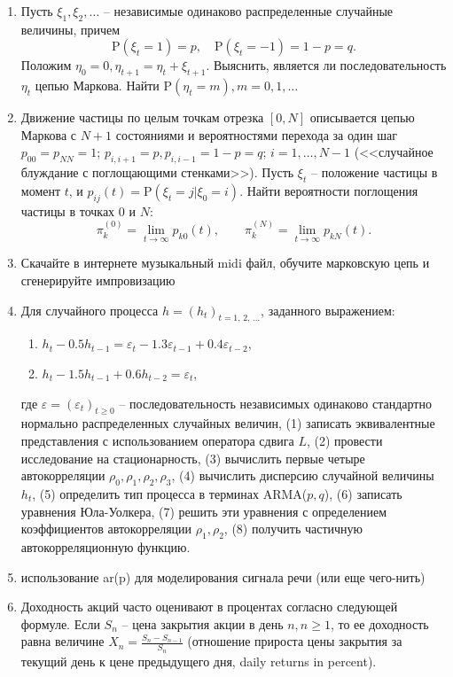 \documentclass[a4paper,14pt]{extreport}
\renewcommand{\=}[1]{\stackrel{#1}{=}} %
\newcommand{\Proba}{\mathrm{P}}
\newcommand{\generaltime}{t \geqslant 0}
\newcommand{\discretetime}{t = 1,\,2,\,\ldots}
\newcommand{\newprocess}[1]{
	\ensuremath{
		#1 = \left(#1 _t\right)_{\generaltime}
	}
}
\newcommand{\newprocessd}[1]{
	\ensuremath{
		#1 = \left(#1 _t\right)_{\discretetime}
	}
}
\begin{document}
\begin{enumerate}

	\item Пусть $\xi_1, \xi_2, \ldots$ -- независимые одинаково
	распределенные случайные величины, причем
	\[
	\Proba (\xi_t = 1) = p, \quad \Proba (\xi_t = -1) = 1 - p = q.
	\]
	Положим $\eta_0 = 0, \eta_{t+1} = \eta_t + \xi_{t + 1}$. 
	Выяснить, является ли последовательность $\eta_t$ цепью Маркова. 
	Найти $\Proba(\eta_t = m), m = 0, 1, \ldots$

	\item Движение частицы по целым точкам отрезка $[0, N]$
	описывается цепью Маркова с $N+1$ состояниями и вероятностями
	перехода за один шаг $p_{00} = p_{NN} = 1$; $p_{i, i+1} = p, p_{i, i-1} = 1 - p = q$;
	$i = 1, \ldots, N - 1$ (<<случайное блуждание с поглощающими
	стенками>>). Пусть  $\xi_t$ -- положение частицы 
	в момент $t$, и $p_{ij}(t) = \Proba (\xi_t = j | \xi_0 = i)$.
	Найти вероятности поглощения частицы в точках $0$ и $N$:
	\[
	\pi_k^{(0)} = \lim\limits_{t \to \infty} p_{k0}(t),
	\qquad
	\pi_k^{(N)} = \lim\limits_{t \to \infty} p_{kN}(t).
	\]

	\item Скачайте в интернете музыкальный midi файл, обучите марковскую цепь и сгенерируйте импровизацию
	\item Для случайного процесса $\newprocessd{h}$, заданного выражением:
	\begin{enumerate}
		\item $h_t - 0.5 h_{t-1} = \varepsilon_t - 1.3 \varepsilon_{t-1} + 0.4 \varepsilon_{t-2}$,
		\item $h_t - 1.5 h_{t-1} + 0.6 h_{t-2} = \varepsilon_t$,
	\end{enumerate}
	где $\newprocess{\varepsilon}$ -- последовательность независимых
	одинаково стандартно нормально распределенных случайных величин,
	(1) записать эквивалентные представления с использованием оператора сдвига $L$,
	(2) провести исследование на стационарность, 
	(3) вычислить первые четыре автокорреляции $\rho_0, \rho_1, \rho_2, \rho_3$,
	(4) вычислить дисперсию случайной величины $h_t$,
	(5) определить тип процесса в терминах ARMA($p, q$),
	(6) записать уравнения Юла-Уолкера,
	(7) решить эти уравнения с определением коэффициентов автокорреляции $\rho_1, \rho_2$,
	(8) получить частичную автокорреляционную функцию.

	\item использование ar(p) для моделирования сигнала речи (или еще чего-нить)
	\item Доходность акций часто оценивают в процентах согласно следующей формуле.
	Если $S_n$ -- цена закрытия акции в день $n, n \geqslant 1$, то ее доходность равна величине
	$X_n = \frac{S_n - S_{n-1}}{S_n}$ (отношение прироста цены закрытия
	за текущий день к цене предыдущего дня, daily returns in percent). 


\end{enumerate}
\end{document}
